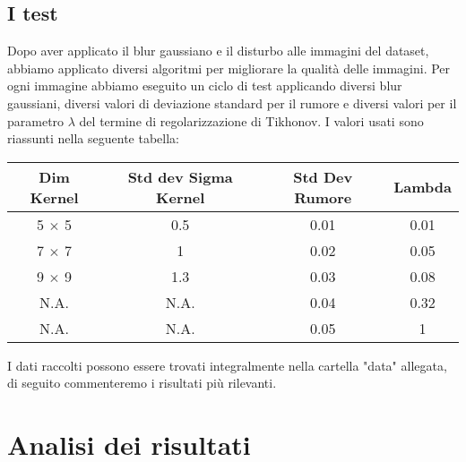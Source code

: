 \documentclass[12pt]{article}
\begin{document}
    \subsection{I test}
    Dopo aver applicato il blur gaussiano e il disturbo alle immagini del dataset, abbiamo applicato diversi algoritmi per migliorare la qualità delle immagini. Per ogni immagine abbiamo eseguito un ciclo di test applicando diversi blur gaussiani, diversi valori di deviazione standard per il rumore e diversi valori per il parametro $\lambda$ del termine di regolarizzazione di Tikhonov. 
    I valori usati sono riassunti nella seguente tabella:
    
    \begin{center}
    \begin{tabular}{||c c c c||} 
     \hline
     Dim Kernel & Std dev Sigma Kernel & Std Dev Rumore & Lambda \\ [0.5ex] 
     \hline\hline
     5 $\times$ 5 & 0.5 & 0.01 & 0.01 \\ 
     \hline
     7 $\times$ 7 & 1 & 0.02 & 0.05 \\
     \hline
     9 $\times$ 9 & 1.3 & 0.03 & 0.08 \\
     \hline
     N.A. & N.A. & 0.04 & 0.32 \\
     \hline
     N.A. & N.A. & 0.05 & 1 \\ [0.2ex] 
     \hline
    \end{tabular}
    \end{center}
    
    I dati raccolti possono essere trovati integralmente nella cartella "data" allegata, di seguito commenteremo i risultati più rilevanti.

\section{Analisi dei risultati}
    
\end{document}
